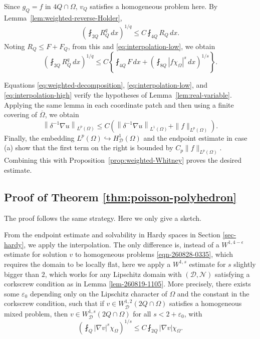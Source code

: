 \documentclass[12pt]{amsart}
\numberwithin{equation}{section}
\newcommand\cD{\mathcal{D}}
\newcommand\cN{\mathcal{N}}
\newcommand{\epsi}{\varepsilon}
\begin{document}
Since $g_Q=f$ in $4Q\cap\Omega$, $v_Q$ satisfies a homogeneous problem here.
By Lemma~\ref{lem:weighted-reverse-Holder},
\begin{align*}
 \left(\fint_{2Q}R_Q^q\,dx\right)^{1/q}
 \leq C\fint_{4Q}R_Q\,dx.
\end{align*}
Noting $R_Q \leq F + F_Q$, from this and \eqref{eq:interpolation-low}, we obtain
\begin{equation}
 \left(\fint_{2Q}R_Q^q\,dx\right)^{1/q}
 \leq C\left\{
      \fint_{4 Q}F\,dx
      +\left(\fint_{8 Q}|f\chi_\Omega|^s\,dx\right)^{1/s}
 \right\}.
 \label{eq:interpolation-high}
\end{equation}

Equations \eqref{eq:weighted-decomposition},
\eqref{eq:interpolation-low}, and \eqref{eq:interpolation-high} verify
the hypotheses of Lemma~\ref{lem:real-variable}.  Applying the same lemma in
each coordinate patch and then using a finite covering of
$\overline\Omega$, we obtain
\begin{equation}
 \left\| \delta^{-1} \nabla u\right\|_{L^p(\Omega)}
 \leq C\left(
     \left\|\delta^{-1}\nabla u\right\|_{L^1(\Omega)}
     +\|f\|_{L^p(\Omega)}
 \right).
 \label{eq:weighted-Lp-intermediate}
\end{equation}
Finally, the embedding $L^p(\Omega) \hookrightarrow H^1_\cD(\Omega)$ and the endpoint estimate in case (a) show that the first term on the right is bounded
by $C_p\|f\|_{L^p(\Omega)}$. 
Combining this with Proposition~\ref{prop:weighted-Whitney} proves
the desired estimate.


\subsection{Proof of Theorem \ref{thm:poisson-polyhedron}}\label{sec-260922-0511}
The proof follows the same strategy. Here we only give a sketch.

From the endpoint estimate and solvability in Hardy spaces in Section \ref{sec-hardy}, we apply the interpolation. The only difference is, instead of a $W^{1,4-\epsilon}$ estimate for solution $v$ to homogeneous problems \eqref{eqn-260828-0335}, which requires the domain to be locally flat, here we apply a $W^{1,s}$ estimate for $s$ slightly bigger than $2$, which works for any Lipschitz domain with $(\cD, \cN)$ satisfying a corkscrew condition as in Lemma \ref{lem-260819-1105}. 
More precisely, there exists some $\epsi_0$ depending only on the Lipschitz character of $\Omega$ and the constant in the corkscrew condition, such that if $v \in W^{1,2}_{\cD} (2Q\cap \Omega)$ satisfies a homogeneous mixed problem, then $v \in W^{1,s}_{\cD} (2Q\cap \Omega)$ for all $s < 2+\epsi_0$, with
\begin{equation*}
    (\fint_{Q} |\nabla v|^s \chi_{\Omega})^{1/s}
    \leq
    C \fint_{2Q} |\nabla v| \chi_{\Omega}.
\end{equation*}
\end{document}
